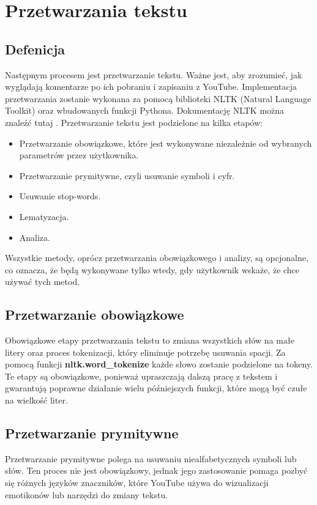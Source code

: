 \section{Przetwarzania tekstu}

	\subsection{Defenicja}
		Następnym procesem jest przetwarzanie tekstu. Ważne jest, aby zrozumieć, jak wyglądają komentarze po ich pobraniu i zapisaniu z YouTube. Implementacja przetwarzania zostanie wykonana za pomocą biblioteki NLTK (Natural Language Toolkit) oraz wbudowanych funkcji Pythona. Dokumentację NLTK można znaleźć tutaj \cite{nltk}. Przetwarzanie tekstu jest podzielone na kilka etapów:
		\begin{itemize}
			\item Przetwarzanie obowiązkowe, które jest wykonywane niezależnie od wybranych parametrów przez użytkownika.
			\item Przetwarzanie prymitywne, czyli usuwanie symboli i cyfr.
			\item Usuwanie stop-words.
			\item Lematyzacja.
			\item Analiza.
		\end{itemize}
		Wszystkie metody, oprócz przetwarzania obowiązkowego i analizy, są opcjonalne, co oznacza, że będą wykonywane tylko wtedy, gdy użytkownik wskaże, że chce używać tych metod.
		
	\subsection{Przetwarzanie obowiązkowe}
		Obowiązkowe etapy przetwarzania tekstu to zmiana wszystkich słów na małe litery oraz proces tokenizacji, który eliminuje potrzebę usuwania spacji. Za pomocą funkcji \textbf{nltk.word_tokenize} każde słowo zostanie podzielone na tokeny. Te etapy są obowiązkowe, ponieważ upraszczają dalszą pracę z tekstem i gwarantują poprawne działanie wielu późniejszych funkcji, które mogą być czułe na wielkość liter.
	
		
	\subsection{Przetwarzanie prymitywne}
		Przetwarzanie prymitywne polega na usuwaniu niealfabetycznych symboli lub słów. Ten proces nie jest obowiązkowy, jednak jego zastosowanie pomaga pozbyć się różnych języków znaczników, które YouTube używa do wizualizacji emotikonów lub narzędzi do zmiany tekstu.

